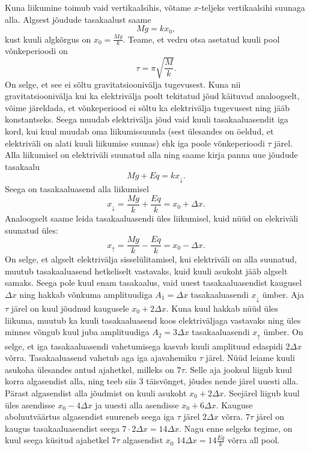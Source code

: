 \documentclass[11pt, twoside]{article}
\begin{document}
{{\ifSolution
Kuna liikumine toimub vaid vertikaalsihis, võtame $x$-teljeks vertikaalsihi suunaga alla. Algsest jõudude tasakaalust saame
$$Mg = kx_0,$$
kust kuuli algkõrgus on $x_0 = \frac{Mg}{k}$. Teame, et vedru otsa asetatud kuuli pool võnkeperioodi on 
$$\tau = \pi \sqrt{\frac{M}{k}}.$$
On selge, et see ei sõltu gravitatsioonivälja tugevusest. Kuna nii gravitatsioonivälja kui ka elektrivälja poolt tekitatud jõud käituvad analoogselt, võime järeldada, et võnkeperiood ei sõltu ka elektrivälja tugevusest ning jääb konstantseks. Seega muudab elektrivälja jõud vaid kuuli tasakaaluasendit iga kord, kui kuul muudab oma liikumissuunda (sest ülesandes on öeldud, et elektriväli on alati kuuli liikumise suunas) ehk iga poole võnkeperioodi $\tau$ järel. Alla liikumisel on elektriväli suunatud alla ning saame kirja panna uue jõudude tasakaalu
$$Mg + Eq = kx_\downarrow.$$
Seega on tasakaaluasend alla liikumisel
$$x_\downarrow = \frac{Mg}{k} + \frac{Eq}{k} = x_0 + \Delta x.$$
Analoogselt saame leida tasakaaluasendi üles liikumisel, kuid nüüd on elekriväli suunatud üles:
$$x_\uparrow = \frac{Mg}{k} - \frac{Eq}{k} = x_0 - \Delta x.$$
On selge, et algselt elektrivälja sisselülitamisel, kui elektriväli on alla suunatud, muutub tasakaaluasend hetkeliselt vastavaks, kuid kuuli asukoht jääb algselt samaks. Seega pole kuul enam tasakaalus, vaid uuest tasakaaluasendist kaugusel $\Delta x$ ning hakkab võnkuma amplituudiga $A_1 = \Delta x$ tasakaaluasendi $x_\downarrow$ ümber. Aja $\tau$ järel on kuul jõudnud kaugusele $x_0 + 2\Delta x$. Kuna kuul hakkab nüüd üles liikuma, muutub ka kuuli tasakaaluasend koos elektriväljaga vastavaks ning üles minnes võngub kuul juba amplituudiga $A_2 = 3 \Delta x$ tasakaaluasendi $x_\uparrow$ ümber.
On selge, et iga tasakaaluasendi vahetumisega kasvab kuuli amplituud edaspidi $2 \Delta x$ võrra. Tasakaaluasend vahetub aga iga ajavahemiku $\tau$ järel.
Nüüd leiame kuuli asukoha ülesandes antud ajahetkel, milleks on $7 \tau$. Selle aja jooksul liigub kuul korra algasendist alla, ning teeb siis $3$ täisvõnget, jõudes nende järel uuesti alla. Pärast algasendist alla jõudmist on kuuli asukoht $x_0 + 2 \Delta x $. Seejärel liigub kuul üles asendisse $x_0 - 4 \Delta x$ ja uuesti alla asendisse $x_0 + 6 \Delta x$. Kauguse aboluutväärtus algasendist suureneb seega iga $\tau$ järel $2 \Delta x$ võrra. $7 \tau$ järel on kaugus tasakaaluasendist seega $7 \cdot 2 \Delta x = 14 \Delta x$.
Nagu enne selgeks tegime, on kuul seega küsitud ajahetkel $7 \tau$ algasendist $x_0$ $14 \Delta x = 14 \frac{Eq}{k}$ võrra all pool.
\fi
}

}
\end{document}
